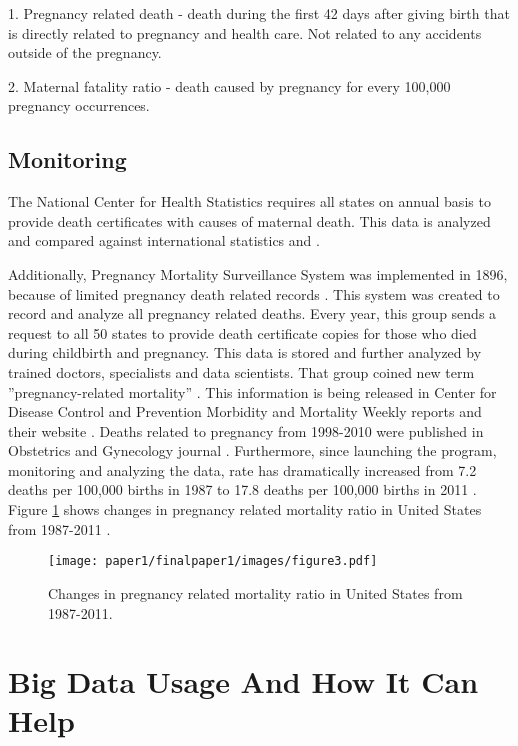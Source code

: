 \documentclass[sigconf]{acmart}
\begin{document}
1. Pregnancy related death - death during the first 42 days after giving birth that is directly related to pregnancy and health care. Not related to any accidents outside of the pregnancy.
   


2. Maternal fatality ratio - death caused by pregnancy for every 100,000 pregnancy occurrences.


\subsection{Monitoring}

The National Center for Health Statistics requires all states on annual basis to provide death certificates with causes of maternal death. This data is analyzed and compared against international statistics \cite{hoyert2007maternal} and \cite{creanga2014maternal}.

Additionally, Pregnancy Mortality Surveillance System was implemented in 1896, because of limited pregnancy death related records  \cite{horon2011effectiveness}. This system was created to record and analyze all pregnancy related deaths. Every year, this group sends a request to all 50 states to provide death certificate copies for those who died during childbirth and pregnancy. This data is stored and further analyzed by trained doctors, specialists and data scientists. That group coined new term ''pregnancy-related mortality'' \cite{callaghan2012overview}. This information is being released in Center for Disease Control and Prevention Morbidity and Mortality Weekly reports and their website \cite{neggers2016trends}. Deaths related to pregnancy from 1998-2010 were published in Obstetrics and Gynecology journal \cite{schulz1994assessing}. Furthermore, since launching the program, monitoring and analyzing the data, rate has dramatically increased from 7.2 deaths per 100,000 births in 1987 to 17.8 deaths per 100,000 births in 2011 \cite{neggers2016trends}. Figure \ref{fig:figure3} shows changes in pregnancy related mortality ratio in United States from 1987-2011 \cite{centers2014pregnancyrelated}.

\begin{figure}
  \centering
  \texttt{[image: paper1/finalpaper1/images/figure3.pdf]}
  \caption{Changes in pregnancy related mortality ratio in United States from 1987-2011.} \label{fig:figure3} 
\end{figure}


\section{Big Data Usage And How It Can Help}
\end{document}
